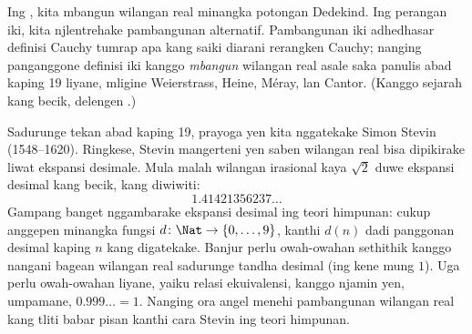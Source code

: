 \documentclass[../../../include/open-logic-section]{subfiles}
\begin{document}


Ing , kita mbangun wilangan real minangka potongan
Dedekind. Ing perangan iki, kita njlentrehake pambangunan alternatif.
Pambangunan iki adhedhasar definisi Cauchy tumrap apa kang saiki diarani
rerangken Cauchy; nanging panganggone definisi iki kanggo \emph{mbangun}
wilangan real asale saka panulis abad kaping 19 liyane, mligine Weierstrass,
Heine, M\'{e}ray, lan Cantor. (Kanggo sejarah kang becik, delengen
\citeauthor{OConnorRobertson:RN} \citeyear{OConnorRobertson:RN}.)

Sadurunge tekan abad kaping 19, prayoga yen kita nggatekake Simon Stevin
(1548--1620). Ringkese, Stevin mangerteni yen saben wilangan real bisa
dipikirake liwat ekspansi desimale. Mula malah wilangan irasional kaya
$\sqrt{2}$ duwe ekspansi desimal kang becik, kang diwiwiti:
\[
	1.41421356237\ldots
\]
Gampang banget nggambarake ekspansi desimal ing teori himpunan: cukup
anggepen minangka fungsi $d \colon \Nat \to \{0,\ldots,9\}$, kanthi $d(n)$ dadi
panggonan desimal kaping $n$ kang digatekake. Banjur perlu owah-owahan
sethithik kanggo nangani bagean wilangan real sadurunge tandha desimal
(ing kene mung $1$). Uga perlu owah-owahan liyane, yaiku relasi
ekuivalensi, kanggo njamin yen, umpamane, $0.999\ldots = 1$. Nanging
ora angel menehi pambangunan wilangan real kang tliti babar pisan
kanthi cara Stevin ing teori himpunan.
\end{document}
